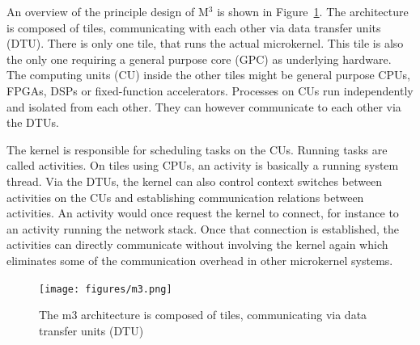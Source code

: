 An overview of the principle design of M$^3$ is shown in Figure~\ref{fig:m3}. The architecture is composed of tiles, communicating with each other via data transfer units (DTU). There is only one tile, that runs the actual microkernel. This tile is also the only one requiring a general purpose core (GPC) as underlying hardware. The computing units (CU) inside the other tiles might be general purpose CPUs, FPGAs, DSPs or fixed-function accelerators. Processes on CUs run independently and isolated from each other. They can however communicate to each other via the DTUs.

The kernel is responsible for scheduling tasks on the CUs. Running tasks are called activities. On tiles using CPUs, an activity is basically a running system thread. Via the DTUs, the kernel can also control context switches between activities on the CUs and establishing communication relations between activities. An activity  would once request the kernel to connect, for instance to an activity  running the network stack. Once that connection is established, the activities can directly communicate without involving the kernel again which eliminates some of the communication overhead in other microkernel systems. 

\begin{figure}[H]
    \centering
    \texttt{[image: figures/m3.png]}
    \caption{The m3 architecture is composed of tiles, communicating via data transfer units (DTU)}
    \label{fig:m3}
\end{figure}

